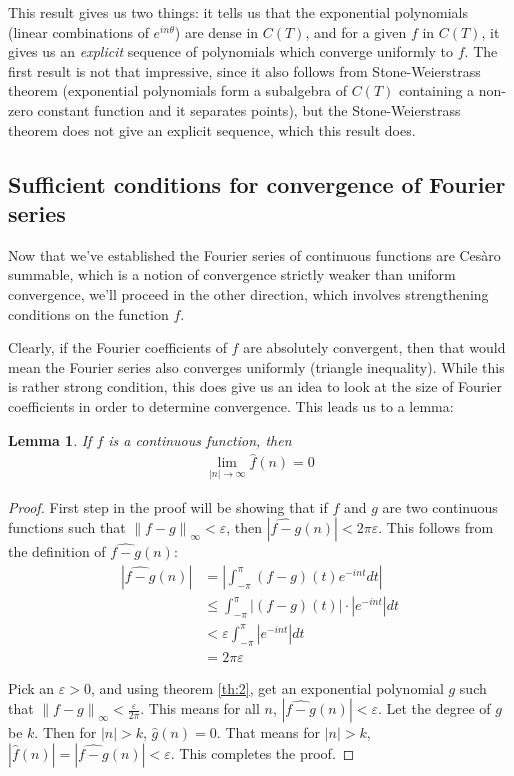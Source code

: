 \documentclass[12pt, titlepage]{article}
\newtheorem{lem}[thm]{Lemma}
\theoremstyle{definition}
\newcommand{\vep}{\varepsilon}
\newcommand{\norm}[1]{\left\lVert#1\right\rVert}
\begin{document}
This result gives us two things: it tells us that the exponential polynomials (linear combinations of $e^{in\theta}$) are dense in $C(T)$, and for a given $f$ in $C(T)$, it gives us an \emph{explicit} sequence of polynomials which converge uniformly to $f$. The first result is not that impressive, since it also follows from Stone-Weierstrass theorem (exponential polynomials form a subalgebra of $C(T)$ containing a non-zero constant function and it separates points), but the Stone-Weierstrass theorem does not give an explicit sequence, which this result does.

\subsection{Sufficient conditions for convergence of Fourier series}
Now that we've established the Fourier series of continuous functions are Cesàro summable, which is a notion of convergence strictly weaker than uniform convergence, we'll proceed in the other direction, which involves strengthening conditions on the function $f$.

Clearly, if the Fourier coefficients of $f$ are absolutely convergent, then that would mean the Fourier series also converges uniformly (triangle inequality). While this is rather strong condition, this does give us an idea to look at the size of Fourier coefficients in order to determine convergence. This leads us to a lemma:
\begin{lem}
    If $f$ is a continuous function, then
    \begin{align*}
        \lim_{|n| \to \infty} \widehat{f}(n) = 0
    \end{align*}
\end{lem}

\begin{proof}
    First step in the proof will be showing that if $f$ and $g$ are two continuous functions such that $\norm{f-g}_{\infty} < \vep$, then $|\widehat{f-g}(n)| < 2\pi \vep$. This follows from the definition of $\widehat{f-g}(n)$:
    \begin{align*}
        |\widehat{f-g}(n)| &= \left| \int_{-\pi}^{\pi} (f-g)(t) e^{-int} dt \right| \\
        &\leq \int_{-\pi}^{\pi} |(f-g)(t)| \cdot |e^{-int}| dt \\
        &< \vep \int_{-\pi}^{\pi} |e^{-int}| dt \\
        &= 2\pi \vep
    \end{align*}
    
    Pick an $\vep > 0$, and using theorem \ref{th:2}, get an exponential polynomial $g$ such that $\norm{f-g}_{\infty} < \frac{\vep}{2\pi}$. This means for all $n$, $|\widehat{f-g}(n)| < \vep$. Let the degree of $g$ be $k$. Then for $|n| > k$, $\widehat{g}(n) = 0$. That means for $|n| > k$, $|\widehat{f}(n)| = |\widehat{f-g}(n)| < \vep$. This completes the proof.
\end{proof}
\end{document}

